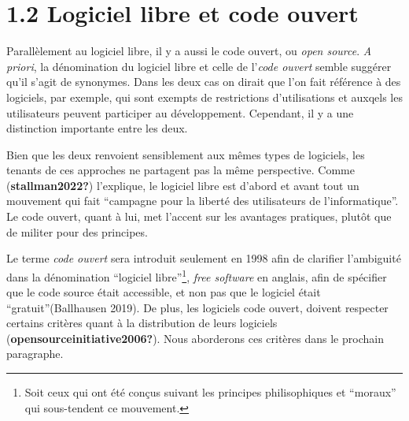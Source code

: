 \documentclass[
  letterpaper,
]{scrbook}
\begin{document}
\hypertarget{logiciel-libre-et-code-ouvert}{%
\section{1.2 Logiciel libre et code
ouvert}\label{logiciel-libre-et-code-ouvert}}

Parallèlement au logiciel libre, il y a aussi le code ouvert, ou
\emph{open source}. \emph{A priori}, la dénomination du logiciel libre
et celle de l'\emph{code ouvert} semble suggérer qu'il s'agit de
synonymes. Dans les deux cas on dirait que l'on fait référence à des
logiciels, par exemple, qui sont exempts de restrictions d'utilisations
et auxqels les utilisateurs peuvent participer au développement.
Cependant, il y a une distinction importante entre les deux.

Bien que les deux renvoient sensiblement aux mêmes types de logiciels,
les tenants de ces approches ne partagent pas la même perspective. Comme
(\textbf{stallman2022?}) l'explique, le logiciel libre est d'abord et
avant tout un mouvement qui fait ``campagne pour la liberté des
utilisateurs de l'informatique''. Le code ouvert, quant à lui, met
l'accent sur les avantages pratiques, plutôt que de militer pour des
principes.

Le terme \emph{code ouvert} sera introduit seulement en 1998 afin de
clarifier l'ambiguité dans la dénomination ``logiciel
libre''\footnote{Soit ceux qui ont été conçus suivant les principes
  philisophiques et ``moraux'' qui sous-tendent ce mouvement.},
\emph{free software} en anglais, afin de spécifier que le code source
était accessible, et non pas que le logiciel était
``gratuit''(Ballhausen 2019). De plus, les logiciels code ouvert,
doivent respecter certains critères quant à la distribution de leurs
logiciels (\textbf{opensourceinitiative2006?}). Nous aborderons ces
critères dans le prochain paragraphe.
\end{document}
